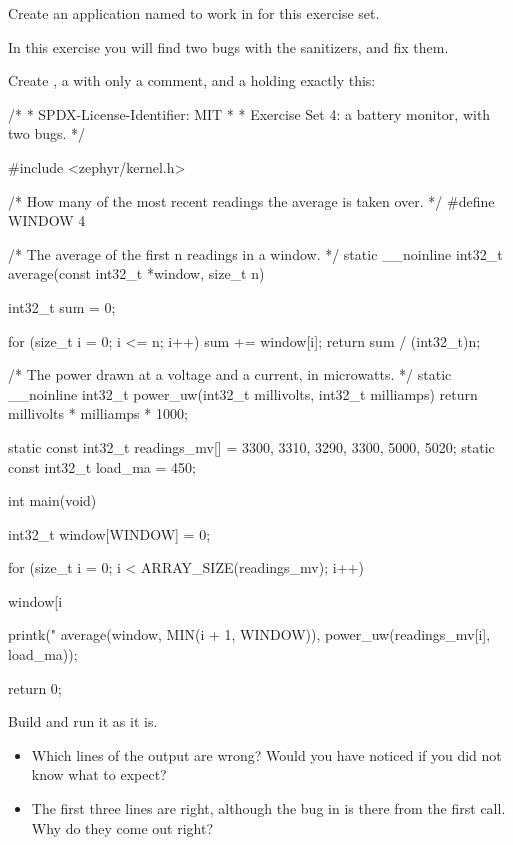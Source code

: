 \label{c6:set:4}
Create an application named  to work in for this exercise set.

\label{c6:ex:4.1}
In this exercise you will find two bugs with the sanitizers, and fix them.

Create , a  with only a comment, and a  holding
exactly this:

\begin{ccode}
/*
 * SPDX-License-Identifier: MIT
 *
 * Exercise Set 4: a battery monitor, with two bugs.
 */

#include <zephyr/kernel.h>

/* How many of the most recent readings the average is taken over. */
#define WINDOW 4

/* The average of the first n readings in a window. */
static __noinline int32_t average(const int32_t *window, size_t n)
{
	int32_t sum = 0;

	for (size_t i = 0; i <= n; i++) {
		sum += window[i];
	}
	return sum / (int32_t)n;
}

/* The power drawn at a voltage and a current, in microwatts. */
static __noinline int32_t power_uw(int32_t millivolts, int32_t milliamps)
{
	return millivolts * milliamps * 1000;
}

static const int32_t readings_mv[] = {3300, 3310, 3290, 3300, 5000, 5020};
static const int32_t load_ma = 450;

int main(void)
{
	int32_t window[WINDOW] = {0};

	for (size_t i = 0; i < ARRAY_SIZE(readings_mv); i++) {
		window[i %

		printk("%
		       average(window, MIN(i + 1, WINDOW)), power_uw(readings_mv[i], load_ma));
	}
	return 0;
}
\end{ccode}

\noindent Build and run it as it is.

\begin{itemize}
  \item Which lines of the output are wrong? Would you have noticed if you did not know what to expect?
  \item The first three lines are right, although the bug in  is there from the first call.
    Why do they come out right?
\end{itemize}

